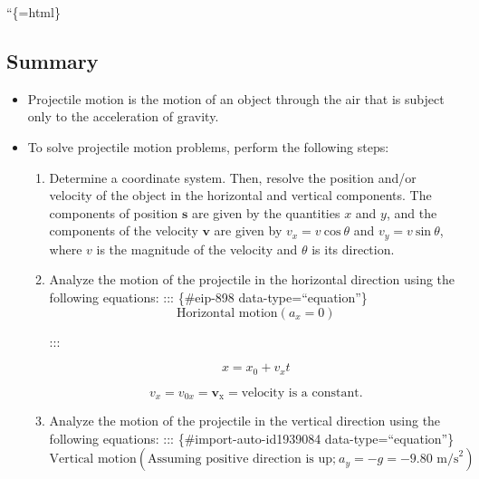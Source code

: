 \documentclass[
]{book}
\begin{document}
``\{=html\}

\hypertarget{fs-id1843457-summary}{}
\hypertarget{summary-3}{%
\subsection{Summary}\label{summary-3}}

\begin{itemize}
\item
  \protect\hypertarget{import-auto-id1677012}{}{Projectile motion is the motion of an object through the air that
  is subject only to the acceleration of
  gravity.}
\item
  \protect\hypertarget{import-auto-id1786765}{}{To solve projectile motion problems, perform the following
  steps:}

  \begin{enumerate}
  \def\labelenumi{\arabic{enumi}.}
  \item
    \protect\hypertarget{import-auto-id1830314}{}{Determine a coordinate system. Then, resolve the position
    and/or velocity of the object in the horizontal and vertical
    components. The components of position \(\mathbf{s}{}\) are given
    by the quantities \(x{}\) and \(y{}\), and the components of the
    velocity \(\mathbf{v}{}\) are given by
    \({{v_{x} = v}\ \text{cos}\ \theta}{}\) and
    \({{v_{y} = v}\ \text{sin}\ \theta}{}\), where \(v{}\) is the
    magnitude of the velocity and \(\theta{}\) is its
    direction.}
  \item
    \protect\hypertarget{import-auto-id1830316}{}{Analyze the motion of the projectile in the horizontal
    direction using the following
    equations:}
    ::: \{\#eip-898 data-type=``equation''\}
    \[{\text{Horizontal\ motion}({a_{x} = 0})}{}\]

    :::

    \leavevmode{}%
    \[{{x = {x_{0} + v_{x}}}t}{}\]

    \leavevmode{}%
    \[{{{v_{x} = v_{0x}} = \textbf{v}_{\text{x}}} = \text{velocity\ is\ a\ constant.}}{}\]
  \item
    \protect\hypertarget{import-auto-id1939082}{}{Analyze the motion of the projectile in the vertical direction
    using the following equations:}
    ::: \{\#import-auto-id1939084 data-type=``equation''\}
    \[{\text{Vertical\ motion}(\text{Assuming\ positive\ direction\ is\ up;}\ {{a_{y} = {- g}} = {- 9}}\text{.}\text{80\ m}\text{/s}^{2})}{}\]


\end{enumerate}
\end{itemize}
\end{document}
